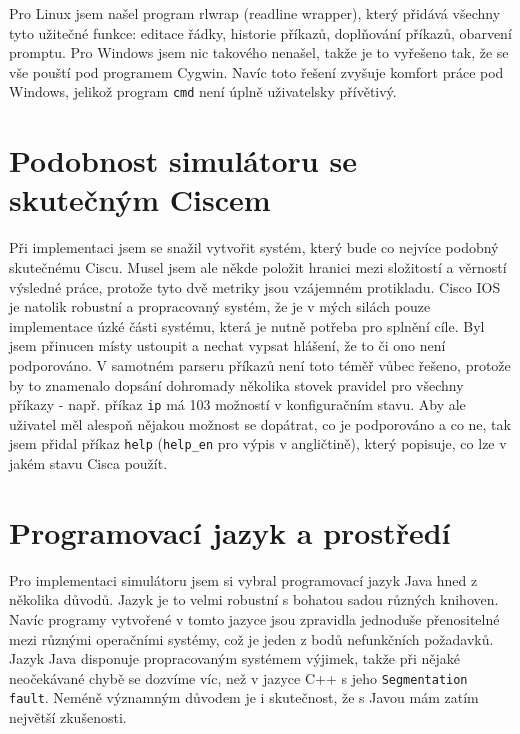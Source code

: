 Pro Linux jsem našel program rlwrap (readline wrapper), který přidává všechny tyto užitečné funkce: editace řádky, historie příkazů, doplňování příkazů, obarvení promptu. Pro Windows jsem nic takového nenašel, takže je to vyřešeno tak, že se vše pouští pod programem Cygwin. Navíc toto řešení zvyšuje komfort práce pod Windows, jelikož program \verb|cmd| není úplně uživatelsky přívětivý.


\section{Podobnost simulátoru se skutečným Ciscem}\label{kap:podobnost}
Při implementaci jsem se snažil vytvořit systém, který bude co nejvíce podobný skutečnému Ciscu. Musel jsem ale někde položit hranici mezi složitostí a věrností výsledné práce, protože tyto dvě metriky jsou vzájemném protikladu. Cisco IOS je natolik robustní a propracovaný systém, že je v mých silách pouze implementace úzké části systému, která je nutně potřeba pro splnění cíle. Byl jsem přinucen místy ustoupit a nechat vypsat hlášení, že to či ono není podporováno. V samotném parseru příkazů není toto téměř vůbec řešeno, protože by to znamenalo dopsání dohromady několika stovek pravidel pro všechny příkazy - např. příkaz \verb|ip| má 103 možností v konfiguračním stavu. Aby ale uživatel měl alespoň nějakou možnost se dopátrat, co je podporováno a co ne, tak jsem přidal příkaz \verb|help| (\verb|help_en| pro výpis v angličtině), který popisuje, co lze v jakém stavu Cisca použít.


\section{Programovací jazyk a prostředí}
Pro implementaci simulátoru jsem si vybral programovací jazyk Java hned z několika důvodů. Jazyk je to velmi robustní s bohatou sadou různých knihoven. Navíc programy vytvořené v tomto jazyce jsou zpravidla jednoduše přenositelné mezi různými operačními systémy, což je jeden z bodů nefunkčních požadavků. Jazyk Java disponuje propracovaným systémem výjimek, takže při nějaké neočekávané chybě se dozvíme víc, než v jazyce C++ s jeho \verb|Segmentation fault|. Neméně významným důvodem je i skutečnost, že s Javou mám zatím největší zkušenosti.

